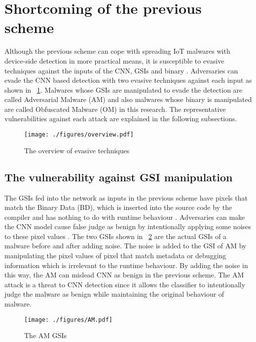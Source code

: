 \section{Shortcoming of the previous scheme } 
Although the previous scheme can cope with spreading IoT malwares with device-side detection in more practical means, it is susceptible to evasive techniques against the inputs of the CNN, GSIs and binary \cite{attack1, attack2}.
Adversaries can evade the CNN based detection with two evasive techniques against each input as shown in \figurename~\ref{fig:ov}.
Malwares whose GSIs are manipulated to evade the detection are called Adversarial Malware (AM) and also malwares whose binary is manipulated are called Obfuscated Malware (OM) in this research.  
The representative vulnerabilities against each attack are explained in the following subsections.

\begin{figure}[p]
 \centering
 \hspace{-55pt}
 \texttt{[image: ./figures/overview.pdf]}
 \caption{The overview of evasive techniques} 
 \label{fig:ov}
\end{figure}
\afterpage{\clearpage}
\newpage

\subsection{The vulnerability against GSI manipulation}
The GSIs fed into the network as inputs in the previous scheme have pixels that match the Binary Data (BD), which is inserted into the source code by the compiler and has nothing to do with runtime behaviour \cite{am}.
Adversaries can make the CNN model cause false judge as benign by intentionally applying some noises to these pixel values \cite{am}.
The two GSIs shown in \figurename~\ref{fig:amGSI} are the actual GSIs of a malware before and after adding noise.
The noise is added to the GSI of AM by manipulating the pixel values of pixel that match metadata or debugging information which is irrelevant to the runtime behaviour.
By adding the noise in this way, the AM can mislead CNN as benign in the previous scheme.
The AM attack is a threat to CNN detection since it allows the classifier to intentionally judge the malware as benign while maintaining the original behaviour of malware.

\begin{figure}[p]
 \centering
 \hspace{-55pt}
 \texttt{[image: ./figures/AM.pdf]}
 \caption{The AM GSIs} 
 \label{fig:amGSI}
\end{figure}
\afterpage{\clearpage}
\newpage

